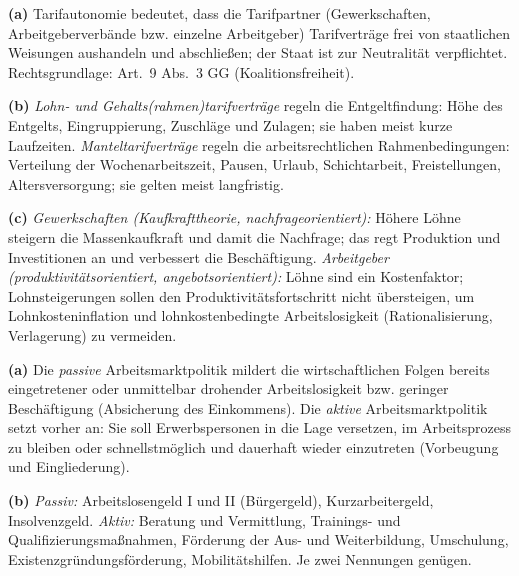 \documentclass[11pt, a4paper]{article}
\begin{document}
\begin{loesung}[title={Lösung Aufgabe~5 --- Tarifpolitik}]
\textbf{(a)} Tarifautonomie bedeutet, dass die Tarifpartner (Gewerkschaften,
Arbeitgeberverbände bzw. einzelne Arbeitgeber) Tarifverträge frei von staatlichen
Weisungen aushandeln und abschließen; der Staat ist zur Neutralität verpflichtet.
Rechtsgrundlage: Art.~9 Abs.~3 GG (Koalitionsfreiheit).

\textbf{(b)} \emph{Lohn- und Gehalts(rahmen)tarifverträge} regeln die Entgeltfindung:
Höhe des Entgelts, Eingruppierung, Zuschläge und Zulagen; sie haben meist kurze
Laufzeiten. \emph{Manteltarifverträge} regeln die arbeitsrechtlichen Rahmenbedingungen:
Verteilung der Wochenarbeitszeit, Pausen, Urlaub, Schichtarbeit, Freistellungen,
Altersversorgung; sie gelten meist langfristig.

\textbf{(c)} \emph{Gewerkschaften (Kaufkrafttheorie, nachfrageorientiert):} Höhere Löhne
steigern die Massenkaufkraft und damit die Nachfrage; das regt Produktion und
Investitionen an und verbessert die Beschäftigung. \emph{Arbeitgeber
(produktivitätsorientiert, angebotsorientiert):} Löhne sind ein Kostenfaktor;
Lohnsteigerungen sollen den Produktivitätsfortschritt nicht übersteigen, um
Lohnkosteninflation und lohnkostenbedingte Arbeitslosigkeit (Rationalisierung,
Verlagerung) zu vermeiden.
\end{loesung}

\begin{loesung}[title={Lösung Aufgabe~6 --- Arbeitsmarktpolitik}]
\textbf{(a)} Die \emph{passive} Arbeitsmarktpolitik mildert die wirtschaftlichen Folgen
bereits eingetretener oder unmittelbar drohender Arbeitslosigkeit bzw. geringer
Beschäftigung (Absicherung des Einkommens). Die \emph{aktive} Arbeitsmarktpolitik setzt
vorher an: Sie soll Erwerbspersonen in die Lage versetzen, im Arbeitsprozess zu bleiben
oder schnellstmöglich und dauerhaft wieder einzutreten (Vorbeugung und Eingliederung).

\textbf{(b)} \emph{Passiv:} Arbeitslosengeld I und II (Bürgergeld), Kurzarbeitergeld,
Insolvenzgeld. \emph{Aktiv:} Beratung und Vermittlung, Trainings- und
Qualifizierungsmaßnahmen, Förderung der Aus- und Weiterbildung, Umschulung,
Existenzgründungsförderung, Mobilitätshilfen. Je zwei Nennungen genügen.
\end{loesung}
\end{document}
